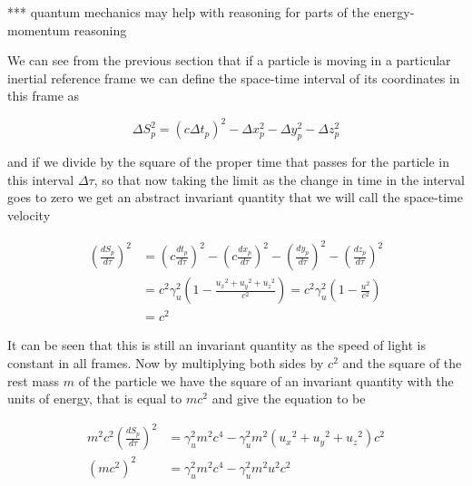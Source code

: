 *** quantum mechanics may help with reasoning for parts of the energy-momentum reasoning


We can see from the previous section that if a particle is moving in a particular inertial reference frame we can define the space-time interval of its coordinates in this frame as

\begin{equation}
	\Delta S_p^2 = (c\Delta {t}_p)^2 -\Delta x_p^2 -\Delta y_p^2 -\Delta z_p^2
\end{equation}

and if we divide by the square of the proper time that passes for the particle in this interval $\Delta\tau$, so that now taking the limit as the change in time in the interval goes to zero we get an abstract invariant quantity that we will call the space-time velocity

\begin{equation}
	\begin{aligned}
		\left(\frac{dS_p}{d\tau}\right)^2 & =  \left(c\frac{{{dt}_{p}}}{d\tau}\right)^2 - \left(c\frac{dx_p}{d\tau}\right)^2 - \left(\frac{dy_p}{d\tau}\right)^2 - \left(\frac{dz_p}{d\tau}\right)^2 \\
		                                  & = c^2\gamma_{u}^2 \left( 1 - \frac{{{u}_{x}}^2 + {{u}_{y}}^2 + {{u}_{z}}^2}{c^2} \right) = c^2\gamma_{u}^2 \left( 1 - \frac{u^2}{c^2} \right)                        \\
		                                  & = c^2
	\end{aligned}
\end{equation}

It can be seen that this is still an invariant quantity as the speed of light is constant in all frames. Now by multiplying both sides by $c^2$ and the square of the rest mass $m$ of the particle we have the square of an invariant quantity with the units of energy, that is equal to $mc^2$ and give the equation to be

\begin{equation}
	\label{eq: energy-momentum derivation}
	\begin{aligned}
		m^2 c^2 \left(\frac{dS_p}{d\tau}\right)^2 & =  \gamma_{u}^2 m^2 c^4 - \gamma_{u}^2 m^2 \left( {{u}_{x}}^2 + {{u}_{y}}^2 + {{u}_{z}}^2 \right) c^2 \\
		(mc^2)^2                                  & =  \gamma_{u}^2 m^2 c^4 - \gamma_{u}^2 m^2 u^2 c^2
	\end{aligned}
\end{equation}

